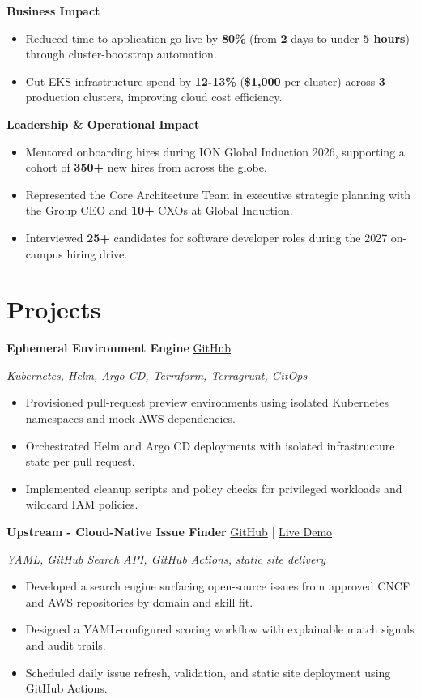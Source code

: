\documentclass[letterpaper,10pt]{article}
\newcommand{\group}[1]{\vspace{3pt}\noindent\textbf{\small #1}\par\vspace{1pt}}
\newcommand{\projectHeading}[2]{%
  \noindent\textbf{#1} \hfill {\small #2}\par\vspace{2pt}%
}
\begin{document}
\group{Business Impact}
\begin{itemize}
  \item Reduced time to application go-live by \textbf{80\%} (from \textbf{2} days to under \textbf{5 hours}) through cluster-bootstrap automation.
  \item Cut EKS infrastructure spend by \textbf{12-13\%} (\textbf{\$1,000} per cluster) across \textbf{3} production clusters, improving cloud cost efficiency.
\end{itemize}

\group{Leadership \& Operational Impact}
\begin{itemize}
  \item Mentored onboarding hires during ION Global Induction 2026, supporting a cohort of \textbf{350+} new hires from across the globe.
  \item Represented the Core Architecture Team in executive strategic planning with the Group CEO and \textbf{10+} CXOs at Global Induction.
  \item Interviewed \textbf{25+} candidates for software developer roles during the 2027 on-campus hiring drive.
\end{itemize}
\normalsize

\section{Projects}
\projectHeading{Ephemeral Environment Engine}{\small \href{https://github.com/simxr/Ephemeral-Environment-Engine}{GitHub}}
\small
\textit{Kubernetes, Helm, Argo CD, Terraform, Terragrunt, GitOps}\par\vspace{1pt}
\begin{itemize}
  \item Provisioned pull-request preview environments using isolated Kubernetes namespaces and mock AWS dependencies.
  \item Orchestrated Helm and Argo CD deployments with isolated infrastructure state per pull request.
  \item Implemented cleanup scripts and policy checks for privileged workloads and wildcard IAM policies.
\end{itemize}
\normalsize

\projectHeading{Upstream - Cloud-Native Issue Finder}{\small \href{https://github.com/simxr/Upstream}{GitHub} | \href{https://simxr.github.io/Upstream/}{Live Demo}}
\small
\textit{YAML, GitHub Search API, GitHub Actions, static site delivery}\par\vspace{1pt}
\begin{itemize}
  \item Developed a search engine surfacing open-source issues from approved CNCF and AWS repositories by domain and skill fit.
  \item Designed a YAML-configured scoring workflow with explainable match signals and audit trails.
  \item Scheduled daily issue refresh, validation, and static site deployment using GitHub Actions.
\end{itemize}
\normalsize
\end{document}
